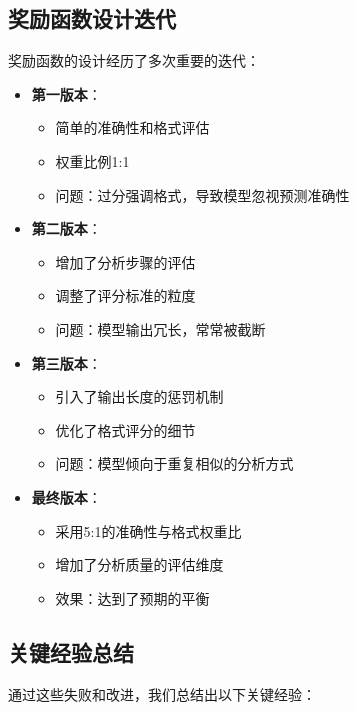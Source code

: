 \documentclass[a4paper, 12pt]{article}
\begin{document}
\subsection{奖励函数设计迭代}
奖励函数的设计经历了多次重要的迭代：

\begin{itemize}
    \item \textbf{第一版本}：
        \begin{itemize}
            \item 简单的准确性和格式评估
            \item 权重比例1:1
            \item 问题：过分强调格式，导致模型忽视预测准确性
        \end{itemize}
    
    \item \textbf{第二版本}：
        \begin{itemize}
            \item 增加了分析步骤的评估
            \item 调整了评分标准的粒度
            \item 问题：模型输出冗长，常常被截断
        \end{itemize}
    
    \item \textbf{第三版本}：
        \begin{itemize}
            \item 引入了输出长度的惩罚机制
            \item 优化了格式评分的细节
            \item 问题：模型倾向于重复相似的分析方式
        \end{itemize}
    
    \item \textbf{最终版本}：
        \begin{itemize}
            \item 采用5:1的准确性与格式权重比
            \item 增加了分析质量的评估维度
            \item 效果：达到了预期的平衡
        \end{itemize}
\end{itemize}

\subsection{关键经验总结}
通过这些失败和改进，我们总结出以下关键经验：
\end{document}
